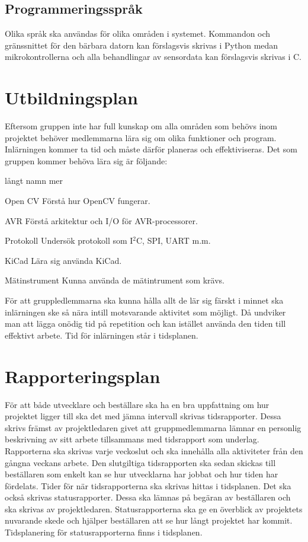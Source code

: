 \documentclass[projektplan/plan.tex]{subfiles}
\begin{document}
\subsection{Programmeringsspråk}
Olika språk ska användas för olika områden i systemet. Kommandon och
gränssnittet för den bärbara datorn kan förslagsvis skrivas i Python medan
mikrokontrollerna och alla behandlingar av sensordata kan förslagsvis skrivas i
C.

\newpage
\section{Utbildningsplan}
\noindent
Eftersom gruppen inte har full kunskap om alla områden som behövs inom
projektet behöver medlemmarna lära sig om olika funktioner och program.
Inlärningen kommer ta tid och måste därför planeras och effektiviseras. Det som
gruppen kommer behöva lära sig är följande:
\begin{labeling}{långt namn mer}
    \item[Open CV] Förstå hur OpenCV fungerar.
    \item[AVR] Förstå arkitektur och I/O för
    AVR-processorer.
    \item[Protokoll] Undersök protokoll som
    I$^2$C, SPI, UART m.m.
    \item[KiCad] Lära sig använda KiCad.
    \item[Mätinstrument] Kunna använda de mätintrument som krävs.
\end{labeling}
För att gruppledlemmarna ska kunna hålla allt de lär sig färskt i minnet ska
inlärningen ske så nära intill motsvarande aktivitet som möjligt. Då undviker
man att lägga onödig tid på repetition och kan istället använda den tiden till
effektivt arbete. Tid för inlärningen står i tidsplanen.

\section{Rapporteringsplan}
För att både utvecklare och beställare ska ha en bra uppfattning om hur
projektet ligger till ska det med jämna intervall skrivas tidsrapporter. Dessa
skrivs främst av projektledaren givet att gruppmedlemmarna lämnar en personlig
beskrivning av sitt arbete tillsammans med tidsrapport som underlag.
Rapporterna ska skrivas varje veckoslut och ska innehålla alla aktiviteter från
den gångna veckans arbete. Den slutgiltiga tidsrapporten ska sedan skickas till
beställaren som enkelt kan se hur utvecklarna har jobbat och hur tiden har
fördelats. Tider för när tidsrapporterna ska skrivas hittas i tidsplanen.  Det
ska också skrivas statusrapporter. Dessa ska lämnas på begäran av beställaren
och ska skrivas av projektledaren. Statusrapporterna ska ge en överblick av
projektets nuvarande skede och hjälper beställaren att se hur långt projektet
har kommit. Tidsplanering för statusrapporterna finns i tidsplanen.
\end{document}
